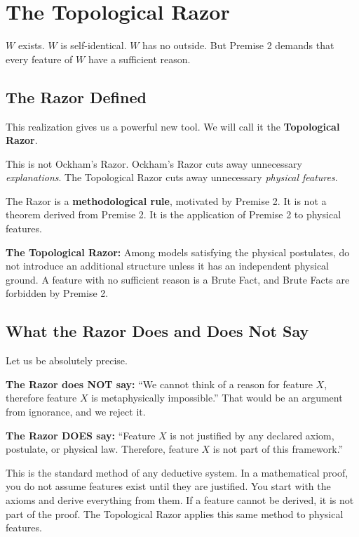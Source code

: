 \documentclass[11pt]{article}
\theoremstyle{canonstyle}
\begin{document}
\newpage

\section{The Topological Razor}

$W$ exists. $W$ is self-identical. $W$ has no outside. But Premise 2 demands that every feature of $W$ have a sufficient reason. 

\subsection{The Razor Defined}

This realization gives us a powerful new tool. We will call it the \textbf{Topological Razor}. 

This is not Ockham's Razor. Ockham's Razor cuts away unnecessary \emph{explanations}. The Topological Razor cuts away unnecessary \emph{physical features}. 

The Razor is a \textbf{methodological rule}, motivated by Premise 2. It is not a theorem derived from Premise 2. It is the application of Premise 2 to physical features.

\begin{keyresult}
\textbf{The Topological Razor:} Among models satisfying the physical postulates, do not introduce an additional structure unless it has an independent physical ground. A feature with no sufficient reason is a Brute Fact, and Brute Facts are forbidden by Premise 2.
\end{keyresult}

\subsection{What the Razor Does and Does Not Say}

Let us be absolutely precise.

\textbf{The Razor does NOT say:} ``We cannot think of a reason for feature $X$, therefore feature $X$ is metaphysically impossible.'' That would be an argument from ignorance, and we reject it.

\textbf{The Razor DOES say:} ``Feature $X$ is not justified by any declared axiom, postulate, or physical law. Therefore, feature $X$ is not part of this framework.''

This is the standard method of any deductive system. In a mathematical proof, you do not assume features exist until they are justified. You start with the axioms and derive everything from them. If a feature cannot be derived, it is not part of the proof. The Topological Razor applies this same method to physical features.
\end{document}
